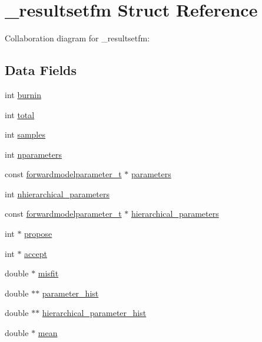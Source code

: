 \hypertarget{struct__resultsetfm}{}\section{\+\_\+resultsetfm Struct Reference}
\label{struct__resultsetfm}


Collaboration diagram for \+\_\+resultsetfm\+:
\subsection*{Data Fields}
\begin{DoxyCompactItemize}
\item 
int \hyperlink{struct__resultsetfm_af2baadf20847f573ddab38052d43354a}{burnin}
\item 
int \hyperlink{struct__resultsetfm_a7cdd1aeb9f8871bb982f13ca61625aac}{total}
\item 
int \hyperlink{struct__resultsetfm_acc38666e6a41cc97a06e3165a215f71d}{samples}
\item 
int \hyperlink{struct__resultsetfm_a8a9ca679792870abea5db1dea416967e}{nparameters}
\item 
const \hyperlink{forwardmodelparameter_8h_a18a7d2fd51fab097145725d83ac328e3}{forwardmodelparameter\+\_\+t} $\ast$ \hyperlink{struct__resultsetfm_a12f7f8c09acf372bcf4ebd9a7c01ed34}{parameters}
\item 
int \hyperlink{struct__resultsetfm_af0d9022e17ad4c2461ddc8f6c0cb3dea}{nhierarchical\+\_\+parameters}
\item 
const \hyperlink{forwardmodelparameter_8h_a18a7d2fd51fab097145725d83ac328e3}{forwardmodelparameter\+\_\+t} $\ast$ \hyperlink{struct__resultsetfm_aad84bea0e2766ac2bf4dc6be83abe897}{hierarchical\+\_\+parameters}
\item 
int $\ast$ \hyperlink{struct__resultsetfm_ac45cd3defd12dbbb212f3b6da70d1b52}{propose}
\item 
int $\ast$ \hyperlink{struct__resultsetfm_a5c18111a85d5580ca7a6f7d4fcbcb7d7}{accept}
\item 
double $\ast$ \hyperlink{struct__resultsetfm_a3032beb7c94f1f86484799c3e916fb0a}{misfit}
\item 
double $\ast$$\ast$ \hyperlink{struct__resultsetfm_aedcaea6a6892921cfc97a91674cbda2d}{parameter\+\_\+hist}
\item 
double $\ast$$\ast$ \hyperlink{struct__resultsetfm_ad2aede9c02fae9e251496c4be6296e88}{hierarchical\+\_\+parameter\+\_\+hist}
\item 
double $\ast$ \hyperlink{struct__resultsetfm_a72335d980019201659b3751f2da0e902}{mean}

\end{DoxyCompactItemize}
